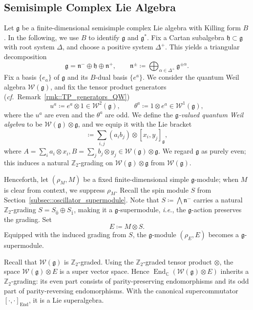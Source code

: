 \documentclass[11pt]{amsart}
\newcommand{\End}{\operatorname{End}}
\def\CC{{\mathbb C}}
\def\gg{{\mathfrak{g}}}
\def\ZZ{{\mathbb Z}}
\theoremstyle{plain}
\theoremstyle{remark}
\theoremstyle{definition}
\numberwithin{equation}{section}
\theoremstyle{remark}
\begin{document}
\subsection{Semisimple Complex Lie Algebra}

Let $\gg$ be a finite-dimensional semisimple complex Lie algebra with Killing form $B$. In the following, we use $B$ to identify $\gg$ and $\gg^{\ast}$. Fix a Cartan subalgebra $\mathfrak{h}\subset\gg$ with root system $\Delta$, and choose a positive system $\Delta^{+}$.
This yields a triangular decomposition
\begin{equation}
\gg=\mathfrak{n}^{-}\oplus\mathfrak{h}\oplus\mathfrak{n}^{+},
\qquad
\mathfrak{n}^{\pm}\coloneqq \bigoplus_{\alpha\in\Delta^{+}}\gg^{\pm\alpha}.
\end{equation}
Fix a basis $\{e_{a}\}$ of $\gg$ and its $B$-dual basis $\{e^{a}\}$. We consider the quantum Weil algebra $\mathcal{W}(\gg)$, and fix the tensor product generators (\emph{cf.}~Remark~\ref{rmk::TP_generators_QW})
\begin{equation}
 u^{a}\coloneqq e^{a}\otimes 1\in \mathcal{W}^{2}(\gg),\qquad
 \theta^{a}\coloneqq 1\otimes e^{a}\in \mathcal{W}^{1}(\gg),
\end{equation}
where the $u^{a}$ are even and the $\theta^{a}$ are odd. We define the $\gg$\emph{-valued quantum Weil algebra} to be $\mathcal{W}(\gg)\otimes\gg$, and we equip it with the Lie bracket
\begin{equation}
 [A,B]\coloneqq \sum_{i,j}(a_{i}b_{j})\otimes [x_{i},y_{j}]_{\gg},
\end{equation}
where $A=\sum_{i}a_{i}\otimes x_{i}, B=\sum_{j}b_{j}\otimes y_{j}\in \mathcal{W}(\gg)\otimes\gg$.
We regard $\gg$ as purely even; this induces a natural $\ZZ_{2}$-grading on
$\mathcal{W}(\gg)\otimes\gg$ from $\mathcal{W}(\gg)$.

Henceforth, let $(\rho_{M},M)$ be a fixed finite-dimensional simple $\gg$-module; when $M$ is clear from context, we suppress $\rho_{M}$.
Recall the spin module $S$ from Section~\ref{subsec::oscillator_supermodule}. Note that $S\coloneqq \bigwedge \mathfrak{n}^{-}$ carries a natural $\ZZ_{2}$-grading
$S=S_{\bar 0}\oplus S_{\bar 1}$, making it a $\gg$-supermodule, \emph{i.e.}, the $\gg$-action preserves the grading.
Set
\begin{equation}
 E\coloneqq M\otimes S.
\end{equation}
Equipped with the induced grading from $S$, the $\gg$-module $(\rho_{E},E)$ becomes a $\gg$-supermodule. 

Recall that $\mathcal{W}(\gg)$ is $\ZZ_{2}$-graded. Using the $\ZZ_{2}$-graded tensor product $\otimes$, the space $\mathcal{W}(\gg)\otimes E$ is a super vector space. Hence $\End_{\CC}(\mathcal{W}(\gg)\otimes E)$ inherits a $\ZZ_{2}$-grading: its even part consists of parity-preserving endomorphisms and its odd part of parity-reversing endomorphisms. With the canonical supercommutator $[\cdot,\cdot]_{\End}$, it is a Lie superalgebra.
\end{document}
